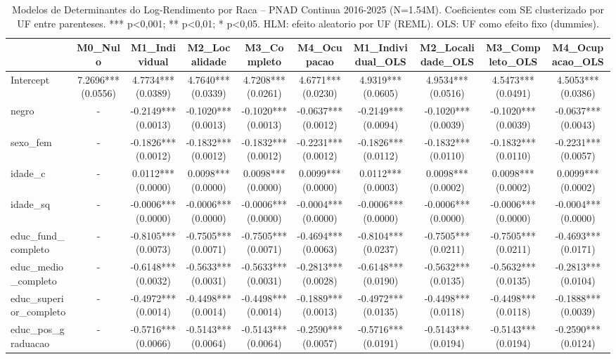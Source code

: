 \begin{table}
\caption{Modelos de Determinantes do Log-Rendimento por Raca -- PNAD Continua 2016-2025 (N=1.54M). Coeficientes com SE clusterizado por UF entre parenteses. *** p<0,001; ** p<0,01; * p<0,05. HLM: efeito aleatorio por UF (REML). OLS: UF como efeito fixo (dummies).}
\label{tab:hlm_serie_completa}
\begin{tabular}{lccccccccc}
\toprule
 & M0_Nulo & M1_Individual & M2_Localidade & M3_Completo & M4_Ocupacao & M1_Individual_OLS & M2_Localidade_OLS & M3_Completo_OLS & M4_Ocupacao_OLS \\
\midrule
Intercept & 7.2696*** (0.0556) & 4.7734*** (0.0389) & 4.7640*** (0.0339) & 4.7208*** (0.0261) & 4.6771*** (0.0230) & 4.9319*** (0.0605) & 4.9534*** (0.0516) & 4.5473*** (0.0491) & 4.5053*** (0.0386) \\
negro & - & -0.2149*** (0.0013) & -0.1020*** (0.0013) & -0.1020*** (0.0013) & -0.0637*** (0.0012) & -0.2149*** (0.0094) & -0.1020*** (0.0039) & -0.1020*** (0.0039) & -0.0637*** (0.0043) \\
sexo_fem & - & -0.1826*** (0.0012) & -0.1832*** (0.0012) & -0.1832*** (0.0012) & -0.2231*** (0.0012) & -0.1826*** (0.0112) & -0.1832*** (0.0110) & -0.1832*** (0.0110) & -0.2231*** (0.0057) \\
idade_c & - & 0.0112*** (0.0000) & 0.0098*** (0.0000) & 0.0098*** (0.0000) & 0.0099*** (0.0000) & 0.0112*** (0.0003) & 0.0098*** (0.0002) & 0.0098*** (0.0002) & 0.0099*** (0.0002) \\
idade_sq & - & -0.0006*** (0.0000) & -0.0006*** (0.0000) & -0.0006*** (0.0000) & -0.0004*** (0.0000) & -0.0006*** (0.0000) & -0.0006*** (0.0000) & -0.0006*** (0.0000) & -0.0004*** (0.0000) \\
educ_fund_completo & - & -0.8105*** (0.0073) & -0.7505*** (0.0071) & -0.7505*** (0.0071) & -0.4694*** (0.0063) & -0.8104*** (0.0237) & -0.7505*** (0.0211) & -0.7505*** (0.0211) & -0.4693*** (0.0171) \\
educ_medio_completo & - & -0.6148*** (0.0032) & -0.5633*** (0.0031) & -0.5633*** (0.0031) & -0.2813*** (0.0028) & -0.6148*** (0.0190) & -0.5632*** (0.0135) & -0.5632*** (0.0135) & -0.2813*** (0.0104) \\
educ_superior_completo & - & -0.4972*** (0.0014) & -0.4498*** (0.0014) & -0.4498*** (0.0014) & -0.1889*** (0.0013) & -0.4972*** (0.0135) & -0.4498*** (0.0118) & -0.4498*** (0.0118) & -0.1888*** (0.0039) \\
educ_pos_graduacao & - & -0.5716*** (0.0066) & -0.5143*** (0.0064) & -0.5143*** (0.0064) & -0.2590*** (0.0057) & -0.5716*** (0.0191) & -0.5143*** (0.0194) & -0.5143*** (0.0194) & -0.2590*** (0.0124) \\

\end{tabular}
\end{table}
